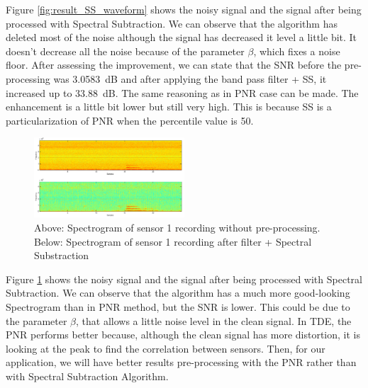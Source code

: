   Figure \ref{fig:result_SS_waveform} shows the noisy signal and the signal after being processed with Spectral Subtraction. We can observe that the algorithm has deleted most of the noise although the signal has decreased it level a little bit. It doesn't decrease all the noise because of the parameter $\beta$, which fixes a noise floor.
  After assessing the improvement, we can state that the SNR before the pre-processing was \SI{3.0583}{\dB} and after applying the band pass filter + SS, it increased up to \SI{33.88}{\dB}. The same reasoning as in PNR case can be made. The enhancement is a little bit lower but still very high. This is because SS is a particularization of PNR when the percentile value is 50.

  \begin{figure}[htb]
	  \begin{center}
		  \includegraphics[width=0.5\textwidth]{figures/4SpectralSub_Specgram.png}
	  \end{center}
	  \caption{Above: Spectrogram of sensor 1 recording without pre-processing.  Below: Spectrogram of sensor 1 recording after filter + Spectral Substraction}
	  \label{fig:result_SS_spec}
  \end{figure}
  
  Figure \ref{fig:result_SS_spec} shows the noisy signal and the signal after being processed with Spectral Subtraction. We can observe that the algorithm has a much more good-looking Spectrogram than in PNR method, but the SNR is lower. This could be due to the parameter $\beta$, that allows a little noise level in the clean signal. In TDE, the PNR performs better because, although the clean signal has more distortion, it is looking at the peak to find the correlation between sensors. Then, for our application, we will have better results pre-processing with the PNR rather than with Spectral Subtraction Algorithm.
  
